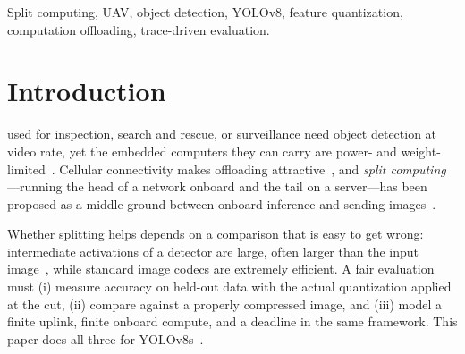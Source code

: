 \documentclass[journal,twocolumn,10pt]{IEEEtran}
\begin{document}
\begin{IEEEkeywords}
Split computing, UAV, object detection, YOLOv8, feature quantization, computation offloading, trace-driven evaluation.
\end{IEEEkeywords}

\section{Introduction}
 used for inspection, search and rescue, or surveillance need object detection at video rate, yet the embedded computers they can carry are power- and weight-limited~\cite{mozaffari2019tutorial,zeng2016wireless}. Cellular connectivity makes offloading attractive~\cite{zeng2019cellular}, and \emph{split computing}---running the head of a network onboard and the tail on a server---has been proposed as a middle ground between onboard inference and sending images~\cite{kang2017neurosurgeon,matsubara2022survey}.

Whether splitting helps depends on a comparison that is easy to get wrong: intermediate activations of a detector are large, often larger than the input image~\cite{matsubara2022survey}, while standard image codecs are extremely efficient. A fair evaluation must (i) measure accuracy on held-out data with the actual quantization applied at the cut, (ii) compare against a properly compressed image, and (iii) model a finite uplink, finite onboard compute, and a deadline in the same framework. This paper does all three for YOLOv8s~\cite{redmon2016you,jocher2023yolo}.
\end{document}
